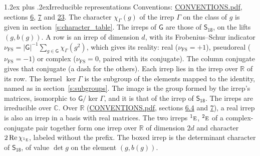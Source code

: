 \documentclass[10pt,a4paper]{article}
\makeatletter
\renewcommand\section{\@startsection{section}{1}{\z@}{-3ex plus -1ex minus -.2ex}%
  {1.2ex plus .2ex}{\normalfont\large\sffamily\bfseries\color{parttitle}}}
\numberwithin{equation}{section}
\newcommand{\grp}[1]{\mathsf{#1}}
\newcommand{\irr}[1]{\text{\normalfont\scshape #1}}
\newcommand{\conjpair}[1]{{}^{#1}}
\newcommand{\irchar}[1]{\chi_{#1}}
\newcommand{\fsind}{\nu_{\mathrm{FS}}}
\makeatother
\begin{document}
\section{Irreducible representations}\label{s:irreps}
Conventions: \href{../../CONVENTIONS.pdf}{CONVENTIONS.pdf}, sections \href{../../../rotation/CONVENTIONS.pdf\#conv.6}{6}, \href{../../../rotation/CONVENTIONS.pdf\#conv.7}{7} and \href{../../CONVENTIONS.pdf\#conv.23}{23}.
\leavevmode\label{n:function.character}\label{n:irrep.Gamma}The character $\irchar{\Gamma}(g)$ of the irrep $\Gamma$ on the class of $g$ is given in section~\ref{s:character_table}. The irreps of $\grp{G}$ are those of \href{../../../rotation/data/pdf/S18.pdf}{$\grp{S_{18}}$}, on the lifts $(g, b(g))$.
\leavevmode\label{n:index.dimension}\label{n:index.frobenius}\label{n:head.irrep}\label{n:head.reality}A row is an irrep of dimension $d$, with its Frobenius--Schur indicator $\fsind = |\grp{G}|^{-1}\allowbreak\sum_{g\in\grp{G}}\irchar{\Gamma}(g^2)$, which gives its reality: real ($\fsind = +1$), pseudoreal ($\fsind = -1$) or complex ($\fsind = 0$, paired with its conjugate). \label{n:head.conjugate}The column conjugate gives that conjugate (a dash for the others). \label{n:head.over.real}Each irrep lies in the irrep over $\mathbb{R}$ of its row. \label{n:head.kernel}The kernel $\ker\Gamma$ is the subgroup of the elements mapped to the identity, named as in section~\ref{s:subgroups}. \label{n:head.image}The image is the group formed by the irrep's matrices, isomorphic to $\grp{G}/\ker\Gamma$, and it is that of the irrep of \href{../../../rotation/data/pdf/S18.pdf}{$\grp{S_{18}}$}. The irreps are irreducible over $\mathbb{C}$. Over $\mathbb{R}$ (\href{../../CONVENTIONS.pdf}{CONVENTIONS.pdf}, sections \href{../../../rotation/CONVENTIONS.pdf\#conv.6.4}{6.4} and \href{../../../rotation/CONVENTIONS.pdf\#conv.7}{7}), a real irrep is also an irrep in a basis with real matrices. The two irreps $\conjpair{1}\irr{e}$, $\conjpair{2}\irr{e}$ of a complex-conjugate pair together form one irrep over $\mathbb{R}$ of dimension $2d$ and character $2\operatorname{Re}\irchar{\conjpair{1}\irr{e}}$, labeled without the prefix. \label{n:mark.determinant}The boxed irrep is the determinant character of \href{../../../rotation/data/pdf/S18.pdf}{$\grp{S_{18}}$}, of value $\det g$ on the element $(g, b(g))$.
\setlength{\emergencystretch}{2em}\par\setlength{\emergencystretch}{0pt}
\end{document}
